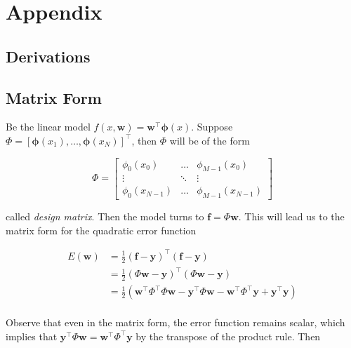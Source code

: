 \section*{\LARGE{Appendix}}

\begin{appendices}
  \vspace{4em}
  \section{Derivations}
  
  \subsection{Matrix Form}
  \label{subsec:app-matrix-form}
  
  Be the linear model $f(x,\mathbf{w}) = \mathbf{w}^\top \boldsymbol{\phi}(x)$. Suppose $\Phi = \left[ \boldsymbol{\phi}(x_1),\dots,\boldsymbol{\phi}(x_N) \right]^\top$, then $\Phi$ will be of the form


\begin{equation}
    \Phi =
    \begin{bmatrix}
      \phi_0(x_0) & \dots & \phi_{M-1}(x_{0}) \\
      \vdots & \ddots & \vdots \\
      \phi_{0}(x_{N-1}) & \dots & \phi_{M-1}(x_{N-1})
    \end{bmatrix}
\end{equation}

called \textit{design matrix}. Then the model turns to $\mathbf{f} = \Phi \mathbf{w}$. This will lead us to the matrix form for the quadratic error function

\begin{align*}
  E(\mathbf{w}) &= \frac{1}{2}(\mathbf{f} - \mathbf{y})^\top (\mathbf{f} - \mathbf{y}) \\
                &= \frac{1}{2}(\Phi \mathbf{w} - \mathbf{y})^\top (\Phi \mathbf{w} - \mathbf{y}) \\
                &= \frac{1}{2}(\mathbf{w}^\top \Phi^\top \Phi \mathbf{w}  - \mathbf{y}^\top \Phi \mathbf{w} - \mathbf{w}^\top \Phi^\top \mathbf{y} + \mathbf{y}^\top \mathbf{y}) \nonumber \\
\end{align*}

Observe that even in the matrix form, the error function remains scalar, which implies that $\mathbf{y}^\top \Phi \mathbf{w} = \mathbf{w}^\top \Phi^\top \mathbf{y}$ by the transpose of the product rule. Then


\end{appendices}
